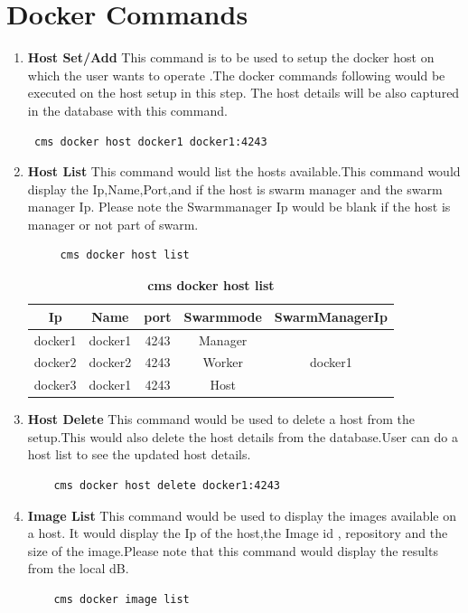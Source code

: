 \documentclass[9pt,twocolumn,twoside]{../../styles/osajnl}
\begin{document}
\section{Docker Commands}
\begin{enumerate}
    \item\textbf{Host Set/Add}
     This command is to be used to setup the docker host on which the user wants to operate .The docker commands following would be executed on the host setup in this step. The host details will be also captured in the database with this command.
    \begin{verbatim} cms docker host docker1 docker1:4243 \end{verbatim}
    
    \item \textbf{Host List}
     This command would list the hosts available.This command would display the Ip,Name,Port,and if the host is swarm manager and the swarm manager Ip. Please note the Swarmmanager Ip would be blank if the host is manager or not part of swarm. 
     \begin{verbatim}
     cms docker host list 
     \end{verbatim}
     
     \begin{table}[h!]
     \caption{\bf cms docker host list }
     \begin{tabular}{ccccc}
     \hline
      Ip & Name & port & Swarmmode &SwarmManagerIp\\
      \hline
      docker1 & docker1 & 4243 & Manager & \\
      docker2 & docker2 & 4243 & Worker & docker1\\
      docker3 & docker1 & 4243 & Host & \\
     \hline
     \end{tabular}
     \label{tab:tab1}
     \end{table}
     
    \item \textbf{Host Delete}
    This command would be used to delete a host from the setup.This would also delete the host details from the database.User can do a host list to see the updated host details.\\
    \begin{verbatim}
    cms docker host delete docker1:4243
    \end{verbatim}
    
    \item \textbf{Image List}
    This command would be used to display the images available on a host.
    It would display the Ip of the host,the Image id , repository and the size of the image.Please note that this command would display the results from the local dB.\\
    \begin{verbatim}
    cms docker image list
    \end{verbatim}
    

\end{enumerate}
\end{document}
